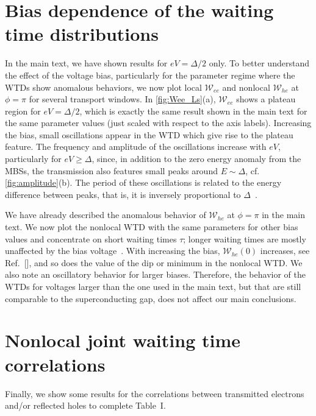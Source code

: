 \documentclass[aps,prl,amsmath,twocolumn,floatfix,superscriptaddress,longbibliography,footinbib]{revtex4-1}
\begin{document}
\section{\label{sec:bias}Bias dependence of the waiting time distributions}
In the main text, we have shown results for $eV=\Delta/2$ only. To better understand the effect of the voltage bias, particularly for the parameter regime where the WTDs show anomalous behaviors, we now plot local $\mathcal{W}_{ee}$ and nonlocal $\mathcal{W}_{he}$ at $\phi\!=\!\pi$ for several transport windows. 
In \cref{fig:Wee_Ls}(a), $\mathcal{W}_{ee}$ shows a plateau region for $eV=\Delta/2$, which is exactly the same result shown in the main text for the same parameter values (just scaled with respect to the axis labels). 
Increasing the bias, small oscillations appear in the WTD which give rise to the plateau feature. The frequency and amplitude of the oscillations increase with $eV$, particularly for $eV\!\ge\!\Delta$, since, in addition to the zero energy anomaly from the MBSs, the transmission also features small peaks around $E\sim\Delta$, cf. \cref{fig:amplitude}(b). The period of these oscillations is related to the energy difference between peaks, that is, it is inversely proportional to $\Delta$~\cite{Haack2014,Mi2018,Schulz2022}. 

We have already described the anomalous behavior of $\mathcal{W}_{he}$ at $\phi=\pi$ in the main text. We now plot the nonlocal WTD with the same parameters for other bias values and concentrate on short waiting times $\tau$; longer waiting times are mostly unaffected by the bias voltage~\cite{Mi2018}. 
With increasing the bias, $\mathcal{W}_{he}(0)$ increases, see Ref.~[], and so does the value of the dip or minimum in the nonlocal WTD. We also note an oscillatory behavior for larger biases. Therefore, the behavior of the WTDs for voltages larger than the one used in the main text, but that are still comparable to the superconducting gap, does not affect our main conclusions. 

\section{Nonlocal joint waiting time correlations\label{sec:joint-wtd}}
Finally, we show some results for the correlations between transmitted electrons and/or reflected holes to complete Table~I. 
\end{document}
